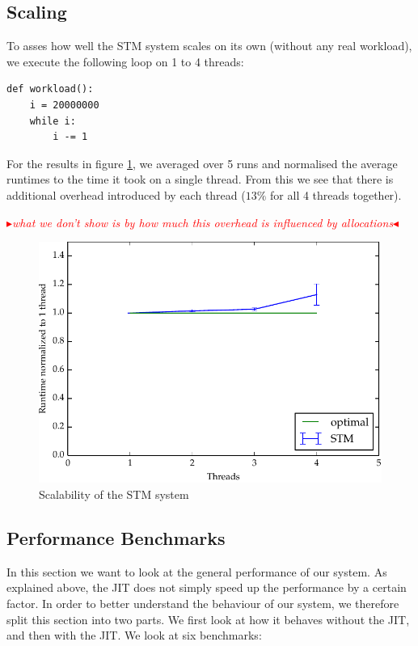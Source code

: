 \documentclass{sigplanconf}
\newcommand{\mynote}[2]{%
  \textcolor{red}{%
    \fbox{\bfseries\sffamily\scriptsize#1}%
    {\small$\blacktriangleright$\textsf{\emph{#2}}$\blacktriangleleft$}%
  }%
}
\newcommand\remi[1]{\mynote{Remi}{#1}}
\begin{document}
\subsection{Scaling}

To asses how well the STM system scales on its own (without any real
workload), we execute the following loop on 1 to 4 threads:
\begin{lstlisting}
def workload():
    i = 20000000
    while i:
        i -= 1
\end{lstlisting}

For the results in figure \ref{fig:scaling}, we averaged
over 5 runs and normalised the average runtimes to the
time it took on a single thread. From this we see that there
is additional overhead introduced by each thread ($13\%$
for all 4 threads together).

\remi{what we don't show is by how much this overhead is influenced
by allocations}

\begin{figure}[h]
  \centering
  \includegraphics[width=1\columnwidth]{plots/scaling.pdf}
  \caption{Scalability of the STM system\label{fig:scaling}}
\end{figure}


\subsection{Performance Benchmarks\label{sec:performance-bench}}

In this section we want to look at the general performance of our
system. As explained above, the JIT does not simply speed up the
performance by a certain factor. In order to better understand the
behaviour of our system, we therefore split this section into two
parts. We first look at how it behaves without the JIT, and then with
the JIT. We look at six benchmarks:
\end{document}

